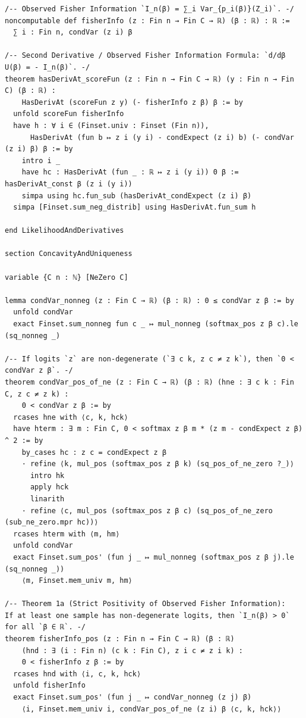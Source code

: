 {\begin{verbatim}
/-- Observed Fisher Information `I_n(β) = ∑_i Var_{p_i(β)}(Z_i)`. -/
noncomputable def fisherInfo (z : Fin n → Fin C → ℝ) (β : ℝ) : ℝ :=
  ∑ i : Fin n, condVar (z i) β

/-- Second Derivative / Observed Fisher Information Formula: `d/dβ U(β) = - I_n(β)`. -/
theorem hasDerivAt_scoreFun (z : Fin n → Fin C → ℝ) (y : Fin n → Fin C) (β : ℝ) :
    HasDerivAt (scoreFun z y) (- fisherInfo z β) β := by
  unfold scoreFun fisherInfo
  have h : ∀ i ∈ (Finset.univ : Finset (Fin n)),
      HasDerivAt (fun b ↦ z i (y i) - condExpect (z i) b) (- condVar (z i) β) β := by
    intro i _
    have hc : HasDerivAt (fun _ : ℝ ↦ z i (y i)) 0 β := hasDerivAt_const β (z i (y i))
    simpa using hc.fun_sub (hasDerivAt_condExpect (z i) β)
  simpa [Finset.sum_neg_distrib] using HasDerivAt.fun_sum h

end LikelihoodAndDerivatives

section ConcavityAndUniqueness

variable {C n : ℕ} [NeZero C]

lemma condVar_nonneg (z : Fin C → ℝ) (β : ℝ) : 0 ≤ condVar z β := by
  unfold condVar
  exact Finset.sum_nonneg fun c _ ↦ mul_nonneg (softmax_pos z β c).le (sq_nonneg _)

/-- If logits `z` are non-degenerate (`∃ c k, z c ≠ z k`), then `0 < condVar z β`. -/
theorem condVar_pos_of_ne (z : Fin C → ℝ) (β : ℝ) (hne : ∃ c k : Fin C, z c ≠ z k) :
    0 < condVar z β := by
  rcases hne with ⟨c, k, hck⟩
  have hterm : ∃ m : Fin C, 0 < softmax z β m * (z m - condExpect z β) ^ 2 := by
    by_cases hc : z c = condExpect z β
    · refine ⟨k, mul_pos (softmax_pos z β k) (sq_pos_of_ne_zero ?_)⟩
      intro hk
      apply hck
      linarith
    · refine ⟨c, mul_pos (softmax_pos z β c) (sq_pos_of_ne_zero (sub_ne_zero.mpr hc))⟩
  rcases hterm with ⟨m, hm⟩
  unfold condVar
  exact Finset.sum_pos' (fun j _ ↦ mul_nonneg (softmax_pos z β j).le (sq_nonneg _))
    ⟨m, Finset.mem_univ m, hm⟩

/-- Theorem 1a (Strict Positivity of Observed Fisher Information):
If at least one sample has non-degenerate logits, then `I_n(β) > 0` for all `β ∈ ℝ`. -/
theorem fisherInfo_pos (z : Fin n → Fin C → ℝ) (β : ℝ)
    (hnd : ∃ (i : Fin n) (c k : Fin C), z i c ≠ z i k) :
    0 < fisherInfo z β := by
  rcases hnd with ⟨i, c, k, hck⟩
  unfold fisherInfo
  exact Finset.sum_pos' (fun j _ ↦ condVar_nonneg (z j) β)
    ⟨i, Finset.mem_univ i, condVar_pos_of_ne (z i) β ⟨c, k, hck⟩⟩


\end{verbatim}}
